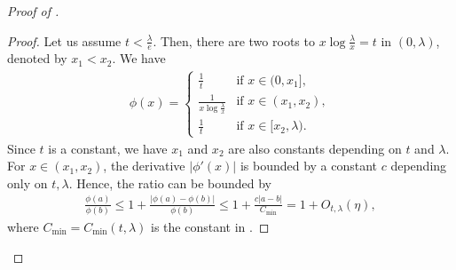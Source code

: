 \documentclass[11pt]{amsart}
\theoremstyle{definition}
\theoremstyle{remark}
\begin{document}
\begin{proof}[Proof of ]
\begin{proof}
Let us assume $t < \frac{\lambda}{e}$. Then, there are two roots to $x \log \frac{\lambda}{x} = t$ in $(0,\lambda)$, denoted by $x_1<x_2$. We have
\begin{align*}
\phi(x) = \begin{cases}
\frac{1}{t} & \text{if } x \in (0,x_1], \\
\frac{1}{x \log \frac{\lambda}{x}} & \text{if } x \in (x_1,x_2), \\
\frac{1}{t} & \text{if } x \in [x_2,\lambda).
\end{cases}
\end{align*}
Since $t$ is a constant, %
we have $x_1$ and $x_2$ are also constants depending on $t$ and $\lambda$. For $x \in (x_1,x_2)$, the derivative $|\phi'(x)|$ is bounded by a constant $c$ depending only on   $t,\lambda$. Hence, the ratio can be bounded by 
\begin{align*}
\frac{\phi(a)}{\phi(b)} \leq 1 + \frac{|\phi(a)-\phi(b)|}{\phi(b)} \leq 1 + \frac{c |a - b|}{C_{\min}} = 1 + O_{t,\lambda} (\eta),
\end{align*}
where $C_{\min} = C_{\min}(t,\lambda)$ is the constant in .
\end{proof}




\end{proof}
\end{document}
